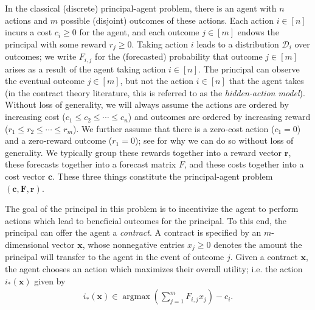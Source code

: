 \documentclass{article}
\DeclareMathOperator*{\argmax}{argmax}
\newcommand{\D}{\mathcal{D}}
\newcommand{\cost}[1]{c_{#1}}
\newcommand{\costvector}{\bm{c}}
\newcommand{\Cost}[1]{c_{#1}}
\newcommand{\CostVector}{\bm{c}}
\newcommand{\Forecast}[2]{F_{#1, #2}}
\newcommand{\ForecastMatrix}{F}
\newcommand{\ForecastTensor}{\bm{F}}
\newcommand{\rewardvector}{\bm{r}}
\newcommand{\Reward}[1]{r_{#1}}
\newcommand{\RewardVector}{\bm{r}}
\newcommand{\PrincipalAgentProblem}{\left(\costvector, \ForecastTensor, \rewardvector\right)}
\newcommand{\Contract}[1]{x_{#1}}
\newcommand{\ContractVector}{\bm{x}}
\newcommand{\OptimalAction}{i_*}
\begin{document}
In the classical (discrete) principal-agent problem, there is an agent with $n$ actions and $m$ possible (disjoint) outcomes of these actions. Each action $i \in [n]$ incurs a cost $\Cost{i} \geq 0$ for the agent, and each outcome $j \in [m]$ endows the principal with some reward $\Reward{j} \geq 0$. Taking action $i$ leads to a distribution $\D_{i}$ over outcomes; we write $\Forecast{i}{j}$ for the (forecasted) probability that outcome $j \in [m]$ arises as a result of the agent taking action $i \in [n]$. The principal can observe the eventual outcome $j \in [m]$, but not the action $i \in [n]$ that the agent takes (in the contract theory literature, this is referred to as the \emph{hidden-action model}). Without loss of generality, we will always assume the actions are ordered by increasing cost ($\Cost{1} \le \Cost{2} \le \cdots \le \cost{n}$) and outcomes are ordered by increasing reward ($\Reward{1} \le \Reward{2} \le \cdots \le \Reward{m}$). We further assume that there is a zero-cost action ($c_1 = 0$) and a zero-reward outcome ($r_1 = 0$); see  for why we can do so without loss of generality. We typically group these rewards together into a reward vector $\RewardVector$, these forecasts together into a forecast matrix $\ForecastMatrix$, and these costs together into a cost vector $\CostVector$. These three things constitute the principal-agent problem $\PrincipalAgentProblem$.

The goal of the principal in this problem is to incentivize the agent to perform actions which lead to beneficial outcomes for the principal. To this end, the principal can offer the agent a \emph{contract}. A contract is specified by an $m$-dimensional vector $\ContractVector$, whose nonnegative entries $\Contract{j} \geq 0$ denotes the amount the principal will transfer to the agent in the event of outcome $j$. Given a contract $\ContractVector$, the agent chooses an action which maximizes their overall utility; i.e. the action $\OptimalAction(\ContractVector)$ given by
\begin{align*}
  \OptimalAction(\ContractVector) \in \argmax \left( \sum_{j=1}^m \Forecast{i}{j} \Contract{j} \right) - \Cost{i} \text{.}
\end{align*}
\end{document}
